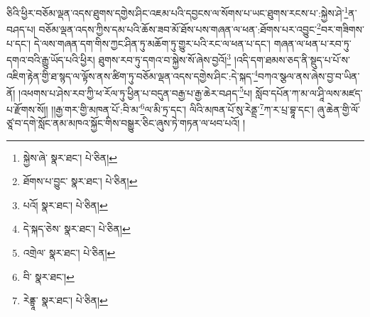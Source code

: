 ཅིའི་ཕྱིར་བཅོམ་ལྡན་འདས་ཐུགས་དགྱེས་ཤིང་འཇམ་པའི་དབྱངས་ལ་སོགས་པ་ཡང་ཐུགས་རངས་པ་:སྐྱེས་ཤེ་\footnote{སྐྱེས་ཞེ་  སྣར་ཐང་།  པེ་ཅིན། }ན་བཤད་པ། བཅོམ་ལྡན་འདས་ཀྱིས་དམ་པའི་ཆོས་ཟབ་མོ་ཐོས་པས་གཞན་ལ་ཕན་:ཐོགས་པར་འབྱུང་\footnote{ཐོགས་པ་བྱུང་  སྣར་ཐང་།  པེ་ཅིན། }བར་གཟིགས་པ་དང་། དེ་ལས་གཞན་དག་གིས་ཀྱང་ཤིན་ཏུ་མཆོག་ཏུ་གྱུར་པའི་རང་ལ་ཕན་པ་དང་། གཞན་ལ་ཕན་པ་རབ་ཏུ་དགའ་བའི་རྒྱུ་ཡོད་པའི་ཕྱིར། ཐུགས་རབ་ཏུ་དགའ་བ་སྐྱེས་སོ་ཞེས་བྱའོ།\footnote{པའོ།  སྣར་ཐང་།  པེ་ཅིན། } །འདི་དག་ཐམས་ཅད་ནི་སྡུད་པ་པོ་ས་འཇིག་རྟེན་གྱི་ཐ་སྙད་ལ་ལྟོས་ནས་ཚིག་ཏུ་བཅོམ་ལྡན་འདས་དགྱེས་ཤིང་:དེ་སྐད་\footnote{དེ་སྐད་ཅེས་  སྣར་ཐང་།  པེ་ཅིན། }བཀའ་སྩལ་ནས་ཞེས་བྱ་བ་ཡིན་ནོ། །འཕགས་པ་ཤེས་རབ་ཀྱི་ཕ་རོལ་ཏུ་ཕྱིན་པ་བདུན་བརྒྱ་པ་རྒྱ་ཆེར་བཤད་\footnote{འགྲེལ་  སྣར་ཐང་།  པེ་ཅིན། }པ། སློབ་དཔོན་ཀ་མ་ལ་ཤཱི་ལས་མཛད་པ་རྫོགས་སོ།། །།རྒྱ་གར་གྱི་མཁན་པོ་:བི་མ་\footnote{བི་  སྣར་ཐང་། }ལ་མི་ཏྲ་དང་། ལིའི་མཁན་པོ་སུ་རེནྡྲ་\footnote{རེནྟྲཱ་  སྣར་ཐང་།  པེ་ཅིན། }ཀ་ར་པྲ་བྷཱ་དང་། ཞུ་ཆེན་གྱི་ལོ་ཙཱ་བ་དགེ་སློང་ནམ་མཁའ་སྐྱོང་གིས་བསྒྱུར་ཅིང་ཞུས་ཏེ་གཏན་ལ་ཕབ་པའོ། །